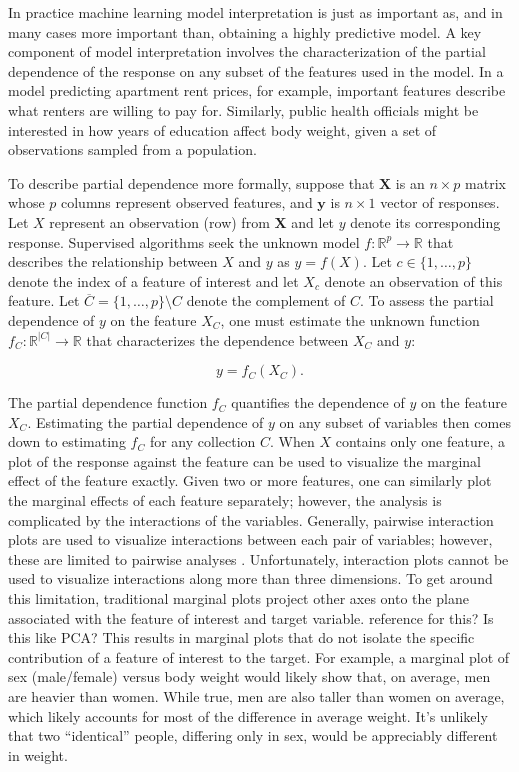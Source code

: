 \documentclass[12pt]{article}
\begin{document}
In practice machine learning model interpretation is just as important as, and in many cases more important than, obtaining a highly predictive model. A key component of model interpretation involves the characterization of the partial dependence of the response on any subset of the features used in the model. In a model predicting apartment rent prices, for example, important features describe what renters are willing to pay for. Similarly, public health officials might be interested in how years of education affect body weight, given a set of observations sampled from a population.

To describe partial dependence more formally, suppose that $\mathbf{X}$ is an $n \times p$ matrix whose $p$ columns represent observed features, and $\mathbf{y}$ is $n \times 1$ vector of responses. Let $X$ represent an observation (row) from $\mathbf{X}$ and let $y$ denote its corresponding response. Supervised algorithms seek the unknown model $f:\mathbb{R}^{p} \rightarrow \mathbb{R}$ that describes the relationship between $X$ and $y$ as ${y} = f({X}).$ Let $c \in \{1, \ldots, p\}$ denote the index of a feature of interest and let $X_c$ denote an observation of this feature. Let $\overline{C} = \{1, \ldots, p\} \setminus C$ denote the complement of $C$. To assess the partial dependence of $y$ on the feature $X_C$, one must estimate the unknown function $f_C: \mathbb{R}^{|C|} \rightarrow \mathbb{R}$ that characterizes the dependence between $X_C$ and $y$:

\begin{equation}\label{problem}
	y = f_C(X_C).
\end{equation}

The partial dependence function $f_C$ quantifies the dependence of $y$ on the feature ${X}_C$. Estimating the partial dependence of $y$ on any subset of variables then comes down to estimating $f_C$ for any collection $C$. When $X$ contains only one feature, a plot of the response against the feature can be used to visualize the marginal effect of the feature exactly. Given two or more features, one can similarly plot the marginal effects of each feature separately; however, the analysis is complicated by the interactions of the variables. Generally, pairwise interaction plots are used to visualize interactions between each pair of variables; however, these are limited to pairwise analyses \citep{cox2014multivariate}. Unfortunately, interaction plots cannot be used to visualize interactions along more than three dimensions. To get around this limitation, traditional marginal plots project other axes onto the plane associated with the feature of interest and target variable. {\color{red} reference for this? Is this like PCA?} This results in marginal plots that do not isolate the specific contribution of a feature of interest to the target. For example, a marginal plot of sex (male/female) versus body weight would likely show that, on average, men are heavier than women. While true, men are also taller than women on average, which likely accounts for most of the difference in average weight. It's unlikely that two ``identical'' people, differing only in sex, would be appreciably different in weight. 
\end{document}
